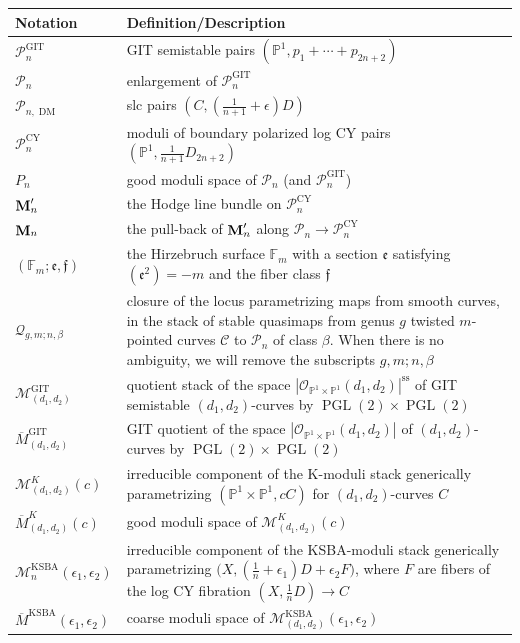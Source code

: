 \documentclass[a4paper,12pt]{amsart}
\newcommand{\ove}[1]{\overline{#1}}
\newcommand{\mtc}[1]{\mathcal{#1}}
\newcommand{\mtf}[1]{\mathfrak{#1}}
\newcommand{\cQ}{\mathcal{Q}}
\DeclareMathOperator{\PGL}{PGL}
\DeclareMathOperator{\CY}{CY}
\DeclareMathOperator{\sst}{ss}
\DeclareMathOperator{\GIT}{GIT}
\newcommand{\bF}{\mathbb{F}}
\DeclareMathOperator{\KSBA}{\mathrm{KSBA}}
\newcommand{\bP}{{\mathbb P}}
\newcommand{\sP}{{\mathscr{P}}}
\newcommand{\sC}{{\mathscr{C}}}
\DeclareMathOperator{\bfM}{{\bf{M}}}
\newcommand{\dm}{{\operatorname{DM}}}
\theoremstyle{definition}
\theoremstyle{remark}
\begin{document}
\begin{center}
\begin{longtable}{| p{} | p{} |}
    \hline \textbf{Notation} & \textbf{Definition/Description}   \\ \hline
    \hline $\sP_n^{\GIT}$ & GIT semistable pairs $(\bP^1,p_1+\cdots+p_{2n+2})$    \\ \hline
      $\sP_n$   & enlargement of $\sP_n^{\GIT}$   \\ \hline
       $\sP_{n,\dm}$   & slc pairs $(C,(\frac{1}{n+1}+\epsilon)D)$   \\ \hline
        $\sP_{n}^{\CY}$   & moduli of boundary polarized log CY pairs $(\bP^1,\frac{1}{n+1}D_{2n+2})$     \\ \hline
        $P_{n}$   & good moduli space of $\sP_{n}$ (and ${\sP}_{n}^{\GIT}$)     \\ \hline
         $\bfM_n'$   & the Hodge line bundle on $\sP_{n}^{\CY}$     \\ \hline
         $\bfM_n$   & the pull-back of $\bfM_n'$ along $\sP_n\rightarrow \sP_{n}^{\CY}$    \\ \hline
          $(\bF_m;\mtf{e},\mtf{f})$   & the Hirzebruch surface $\bF_m$ with a section $\mtf{e}$ satisfying $(\mtf{e}^2)=-m$  and the fiber class $\mtf{f}$     \\ \hline
           $\cQ_{g,m;n,\beta}$   & closure of the locus parametrizing maps from smooth curves, in the stack of stable quasimaps from genus $g$ twisted $m$-pointed curves $\sC$ to $\sP_n$ of class $\beta$. When there is no ambiguity, we will remove the subscripts $g,m;n,\beta$    \\ \hline
               $\mtc{M}^{\GIT}_{(d_1,d_2)}$    & quotient stack of the space $|\mtc{O}_{\bP^1\times\bP^1}(d_1,d_2)|^{\sst}$ of GIT semistable $(d_1,d_2)$-curves by $\PGL(2)\times\PGL(2)$    \\ \hline
          $\ove{M}^{\GIT}_{(d_1,d_2)}$    & GIT quotient of the space $|\mtc{O}_{\bP^1\times\bP^1}(d_1,d_2)|$ of $(d_1,d_2)$-curves by $\PGL(2)\times\PGL(2)$   \\ \hline
          $\mtc{M}^{K}_{(d_1,d_2)}(c)$    & irreducible component of the K-moduli stack generically parametrizing $(\bP^1\times\bP^1,cC)$ for $(d_1,d_2)$-curves $C$    \\ \hline
          $\ove{M}^{K}_{(d_1,d_2)}(c)$    & good moduli space of $\mtc{M}^{K}_{(d_1,d_2)}(c)$    \\ \hline
          $\mtc{M}^{\KSBA}_n(\epsilon_1,\epsilon_2)$    & irreducible component of the KSBA-moduli stack generically parametrizing $\big(X,(\frac{1}{n}+\epsilon_1)D+\epsilon_2F\big)$, where $F$ are fibers of the log CY  fibration $(X,\frac{1}{n}D)\rightarrow C$    \\ \hline
          $\ove{M}^{\KSBA}(\epsilon_1,\epsilon_2)$    & coarse moduli space of $\mtc{M}^{\KSBA}_{(d_1,d_2)}(\epsilon_1,\epsilon_2)$    \\ \hline
        

\end{longtable}
\end{center}
\end{document}
